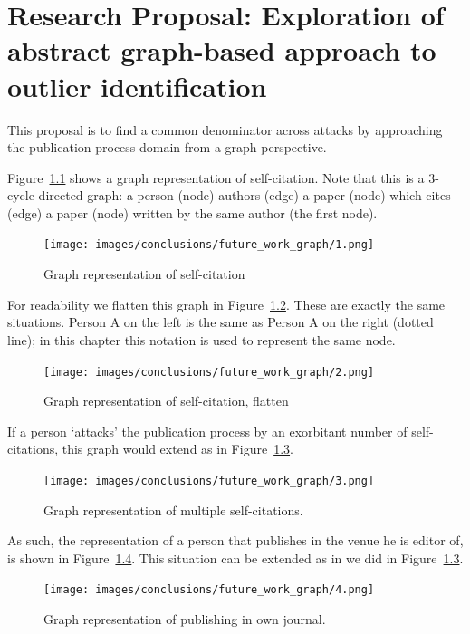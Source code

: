 \documentclass{ou-report}
\begin{document}
\chapter{Research Proposal: Exploration of abstract graph-based approach to outlier identification}
\label{chp:graph_based_approach}

This proposal is to find a common denominator across attacks by approaching the 
publication process domain from a graph perspective.

Figure~\ref{fig:graph_1} shows a graph representation of self-citation.
Note that this is a 3-cycle directed graph: a person (node) authors (edge) a 
paper (node) which cites (edge) a paper (node) written by the same author (the 
first node).

\begin{figure}[H]
    \centering
    \texttt{[image: images/conclusions/future\_work\_graph/1.png]}
    \caption{Graph representation of self-citation}
    \label{fig:graph_1}
\end{figure}

For readability we flatten this graph in Figure~\ref{fig:graph_2}. These are 
exactly the same situations. Person A on the left is the same as Person A on
the right (dotted line); in this chapter this notation is used to represent
the same node.

\begin{figure}[H]
    \centering
    \texttt{[image: images/conclusions/future\_work\_graph/2.png]}
    \caption{Graph representation of self-citation, flatten}
    \label{fig:graph_2}
\end{figure}

If a person `attacks' the publication process by an exorbitant number of 
self-citations, this graph would extend as in Figure~\ref{fig:graph_3}.

\begin{figure}[H]
    \centering
    \texttt{[image: images/conclusions/future\_work\_graph/3.png]}
    \caption{Graph representation of multiple self-citations.}
    \label{fig:graph_3}
\end{figure}

As such, the representation of a person that publishes in the venue he is editor
of, is shown in Figure~\ref{fig:graph_4}. This situation can be extended as in
we did in Figure~\ref{fig:graph_3}.

\begin{figure}[H]
    \centering
    \texttt{[image: images/conclusions/future\_work\_graph/4.png]}
    \caption{Graph representation of publishing in own journal.}
    \label{fig:graph_4}
\end{figure}
\end{document}

